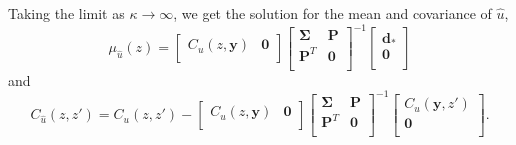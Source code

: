 \documentclass[10pt,a4paper]{article}
\begin{document}
Taking the limit as $\kappa \to \infty$, we get the solution for the mean and covariance of $\hat{u}$,
 \begin{equation}\label{eq:PosteriorMean3}
\mu_{\hat{u}}(z) =
\left[ 
\begin{array}{cc}
C_u(z,\bm{y}) & \bm{0} \\
\end{array}
\right]
\left[
\begin{array}{cc}
\bm{\Sigma} & \bm{P} \\
\bm{P}^T  & \bm{0} \\
\end{array}
\right]^{-1}
\left[
\begin{array}{c}
\bm{d}_* \\
\bm{0} \\
\end{array}
\right]
\end{equation}    
and
\begin{equation}\label{eq:PosteriorCov3}
C_{\hat{u}}(z,z') = 
C_u(z,z') - 
\left[ 
\begin{array}{cc}
C_u(z,\bm{y}) & \bm{0} \\
\end{array}
\right]
\left[
\begin{array}{cc}
\bm{\Sigma} & \bm{P} \\
\bm{P}^T  & \bm{0} \\
\end{array}
\right]^{-1}
\left[
\begin{array}{c}
C_u(\bm{y},z') \\
\bm{0} \\
\end{array}
\right].
\end{equation}
\end{document}

